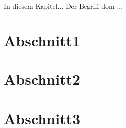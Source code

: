 \label{Kapitel1}

In diesem Kapitel...
Der Begriff \gls{dom} ... \cite{fb-enginering-backtonative} \cite{Liu2011}

\section{Abschnitt1}

\section{Abschnitt2}

\section{Abschnitt3}
